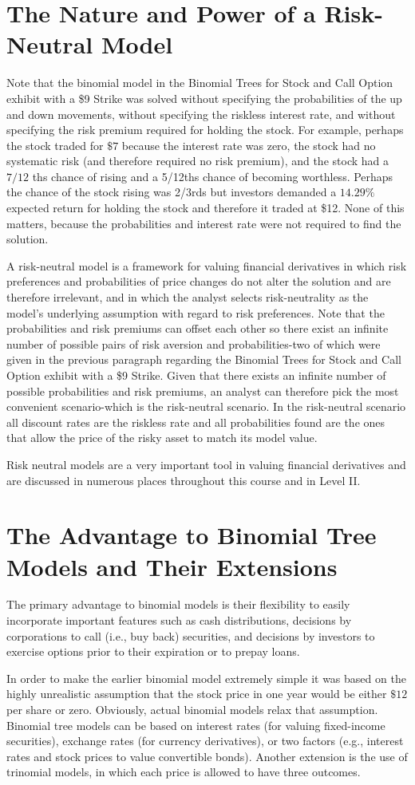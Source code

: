 \documentclass[11pt]{article}
\begin{document}
\section*{The Nature and Power of a Risk-Neutral Model}
Note that the binomial model in the Binomial Trees for Stock and Call Option exhibit with a \$9 Strike was solved without specifying the probabilities of the up and down movements, without specifying the riskless interest rate, and without specifying the risk premium required for holding the stock. For example, perhaps the stock traded for $\$ 7$ because the interest rate was zero, the stock had no systematic risk (and therefore required no risk premium), and the stock had a $7 / 12$ ths chance of rising and a 5/12ths chance of becoming worthless. Perhaps the chance of the stock rising was 2/3rds but investors demanded a $14.29 \%$ expected return for holding the stock and therefore it traded at \$12. None of this matters, because the probabilities and interest rate were not required to find the solution.

A risk-neutral model is a framework for valuing financial derivatives in which risk preferences and probabilities of price changes do not alter the solution and are therefore irrelevant, and in which the analyst selects risk-neutrality as the model's underlying assumption with regard to risk preferences. Note that the probabilities and risk premiums can offset each other so there exist an infinite number of possible pairs of risk aversion and probabilities-two of which were given in the previous paragraph regarding the Binomial Trees for Stock and Call Option exhibit with a \$9 Strike. Given that there exists an infinite number of possible probabilities and risk premiums, an analyst can therefore pick the most convenient scenario-which is the risk-neutral scenario. In the risk-neutral scenario all discount rates are the riskless rate and all probabilities found are the ones that allow the price of the risky asset to match its model value.

Risk neutral models are a very important tool in valuing financial derivatives and are discussed in numerous places throughout this course and in Level II.

\section*{The Advantage to Binomial Tree Models and Their Extensions}
The primary advantage to binomial models is their flexibility to easily incorporate important features such as cash distributions, decisions by corporations to call (i.e., buy back) securities, and decisions by investors to exercise options prior to their expiration or to prepay loans.

In order to make the earlier binomial model extremely simple it was based on the highly unrealistic assumption that the stock price in one year would be either $\$ 12$ per share or zero. Obviously, actual binomial models relax that assumption. Binomial tree models can be based on interest rates (for valuing fixed-income securities), exchange rates (for currency derivatives), or two factors (e.g., interest rates and stock prices to value convertible bonds). Another extension is the use of trinomial models, in which each price is allowed to have three outcomes.
\end{document}
